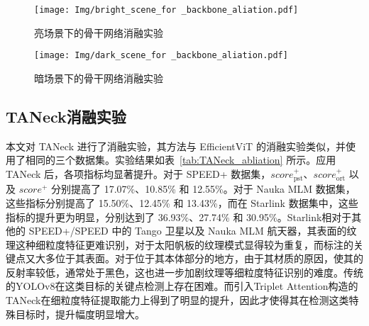 \begin{table}[!htbp]
	\centering
	\caption{在明暗场景下的骨干网络消融实验}
	\label{tab:EfficientViT Abliation_light}
	{%
	}
\end{table}


\begin{figure}[htbp]
	\centering
	\texttt{[image: Img/bright\_scene\_for \_backbone\_aliation.pdf]}
	\caption{亮场景下的骨干网络消融实验}
	\label{fig:bright_scene_comp}
	\vspace{-3ex}
\end{figure}



\begin{figure}[htbp]
	\centering
	\texttt{[image: Img/dark\_scene\_for \_backbone\_aliation.pdf]}
	\caption{暗场景下的骨干网络消融实验}
	\label{fig:dark_scene_comp}
	\vspace{-3ex}
\end{figure}



\vspace{12pt}
\subsection{TANeck消融实验}

本文对 TANeck 进行了消融实验，其方法与 EfficientViT 的消融实验类似，并使用了相同的三个数据集。实验结果如表~\ref{tab:TANeck_abliation} 所示。应用 TANeck 后，各项指标均显著提升。对于 SPEED+ 数据集，$score_{\text{pst}}^+$、$score_{\text{ort}}^+$ 以及 $score^+$ 分别提高了 17.07\%、10.85\% 和 12.55\%。对于 Nauka MLM 数据集，这些指标分别提高了 15.50\%、12.45\% 和 13.43\%，而在 Starlink 数据集中，这些指标的提升更为明显，分别达到了 36.93\%、27.74\% 和 30.95\%。Starlink相对于其他的 SPEED+/SPEED 中的 Tango 卫星以及 Nauka MLM 航天器，其表面的纹理这种细粒度特征更难识别，对于太阳帆板的纹理模式显得较为重复，而标注的关键点又大多位于其表面。对于位于其本体部分的地方，由于其材质的原因，使其的反射率较低，通常处于黑色，这也进一步加剧纹理等细粒度特征识别的难度。传统的YOLOv8在这类目标的关键点检测上存在困难。而引入Triplet Attention构造的TANeck在细粒度特征提取能力上得到了明显的提升，因此才使得其在检测这类特殊目标时，提升幅度明显增大。



